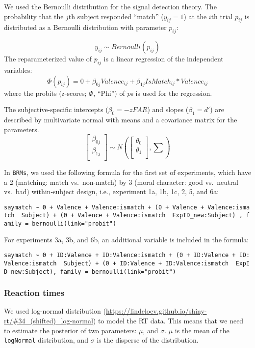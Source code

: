 \documentclass[
  man]{apa6}
\begin{document}
We used the Bernoulli distribution for the signal detection theory. The probability that the \(j\)th subject responded ``match'' (\(y_{ij} = 1\)) at the \(i\)th trial \(p_{ij}\) is distributed as a Bernoulli distribution with parameter \(p_{ij}\):

\[ y_{ij} \sim Bernoulli(p_{ij})\]
The reparameterized value of \(p_{ij}\) is a linear regression of the independent variables:
\[ \Phi(p_{ij}) = 0 + \beta_{0j}Valence_{ij} + \beta_{1j}IsMatch_{ij} * Valence_{ij}\]
where the probits (z-scores; \(\Phi\), ``Phi'') of \(p\)s is used for the regression.

The subjective-specific intercepts (\(\beta_{0} = -zFAR\)) and slopes (\(\beta_{1} = d'\)) are described by multivariate normal with means and a covariance matrix for the parameters.
\[ \begin{bmatrix}\beta_{0j}\\
\beta_{1j}\\
\end{bmatrix} \sim N(\begin{bmatrix}\theta_{0}\\
\theta_{1}\\
\end{bmatrix}, \sum) \]

In \texttt{BRMs}, we used the following formula for the first set of experiments, which have a 2 (matching: match vs.~non-match) by 3 (moral character: good vs.~neutral vs.~bad) within-subject design, i.e., experiment 1a, 1b, 1c, 2, 5, and 6a:

\texttt{saymatch\ \textasciitilde{}\ 0\ +\ Valence\ +\ Valence:ismatch\ +\ (0\ +\ Valence\ +\ Valence:ismatch\ \textbar{}\ Subject)\ +\ (0\ +\ Valence\ +\ Valence:ismatch\ \textbar{}\ ExpID\_new:Subject)\ ,\ family\ =\ bernoulli(link="probit")}

For experiments 3a, 3b, and 6b, an additional variable is included in the formula:

\texttt{saymatch\ \textasciitilde{}\ 0\ +\ ID:Valence\ +\ ID:Valence:ismatch\ +\ (0\ +\ ID:Valence\ +\ ID:Valence:ismatch\ \textbar{}\ Subject)\ +\ (0\ +\ ID:Valence\ +\ ID:Valence:ismatch\ \textbar{}\ ExpID\_new:Subject),\ family\ =\ bernoulli(link="probit")}

\hypertarget{reaction-times}{%
\subsubsection{Reaction times}\label{reaction-times}}

We used log-normal distribution (\url{https://lindeloev.github.io/shiny-rt/\#34_(shifted)_log-normal}) to model the RT data. This means that we need to estimate the posterior of two parameters: \(\mu\), and \(\sigma\). \(\mu\) is the mean of the \texttt{logNormal} distribution, and \(\sigma\) is the disperse of the distribution.
\end{document}
